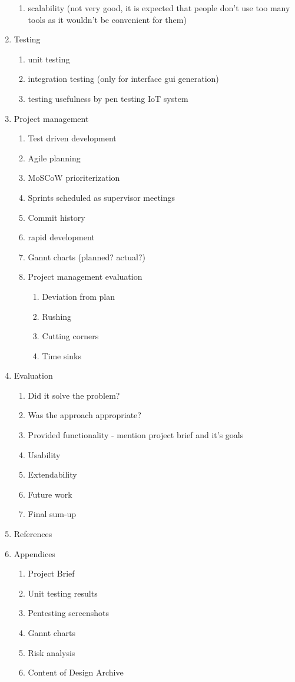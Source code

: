 \begin{enumerate}
\begin{enumerate}
		\item scalability (not very good, it is expected that people don't use too many tools as it wouldn't be convenient for them)
	\end{enumerate}

	\item Testing
	\begin{enumerate}
		\item unit testing
		\item integration testing (only for interface gui generation)
		\item testing usefulness by pen testing IoT system
	\end{enumerate}

	\item Project management
	\begin{enumerate}
		\item Test driven development
		\item Agile planning
		\item MoSCoW prioriterization
		\item Sprints scheduled as supervisor meetings
		\item Commit history
		\item rapid development
		\item Gannt charts (planned? actual?)
		\item Project management evaluation
		\begin{enumerate}
			\item Deviation from plan
			\item Rushing
			\item Cutting corners
			\item Time sinks
		\end{enumerate}
	\end{enumerate}

	\item Evaluation
	\begin{enumerate}
		\item Did it solve the problem?
		\item Was the approach appropriate?
		\item Provided functionality - mention project brief and it's goals
		\item Usability
		\item Extendability
		\item Future work
		\item Final sum-up
	\end{enumerate}

	\item References
	
	\item Appendices
	\begin{enumerate}
		\item Project Brief
		\item Unit testing results
		\item Pentesting screenshots
		\item Gannt charts
		\item Risk analysis
		\item Content of Design Archive
	\end{enumerate}
  
\end{enumerate}

